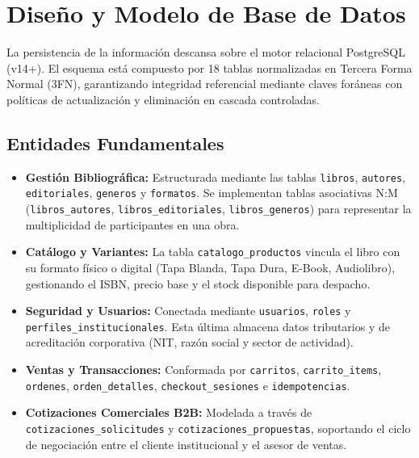 \documentclass[conference]{IEEEtran}
\begin{document}
\section{Diseño y Modelo de Base de Datos}
La persistencia de la información descansa sobre el motor relacional PostgreSQL (v14+). El esquema está compuesto por 18 tablas normalizadas en Tercera Forma Normal (3FN), garantizando integridad referencial mediante claves foráneas con políticas de actualización y eliminación en cascada controladas.

\subsection{Entidades Fundamentales}
\begin{itemize}
    \item \textbf{Gestión Bibliográfica:} Estructurada mediante las tablas \texttt{libros}, \texttt{autores}, \texttt{editoriales}, \texttt{generos} y \texttt{formatos}. Se implementan tablas asociativas N:M (\texttt{libros\_autores}, \texttt{libros\_editoriales}, \texttt{libros\_generos}) para representar la multiplicidad de participantes en una obra.
    \item \textbf{Catálogo y Variantes:} La tabla \texttt{catalogo\_productos} vincula el libro con su formato físico o digital (Tapa Blanda, Tapa Dura, E-Book, Audiolibro), gestionando el ISBN, precio base y el stock disponible para despacho.
    \item \textbf{Seguridad y Usuarios:} Conectada mediante \texttt{usuarios}, \texttt{roles} y \texttt{perfiles\_institucionales}. Esta última almacena datos tributarios y de acreditación corporativa (NIT, razón social y sector de actividad).
    \item \textbf{Ventas y Transacciones:} Conformada por \texttt{carritos}, \texttt{carrito\_items}, \texttt{ordenes}, \texttt{orden\_detalles}, \texttt{checkout\_sesiones} e \texttt{idempotencias}.
    \item \textbf{Cotizaciones Comerciales B2B:} Modelada a través de \texttt{cotizaciones\_solicitudes} y \texttt{cotizaciones\_propuestas}, soportando el ciclo de negociación entre el cliente institucional y el asesor de ventas.
\end{itemize}

\end{document}
